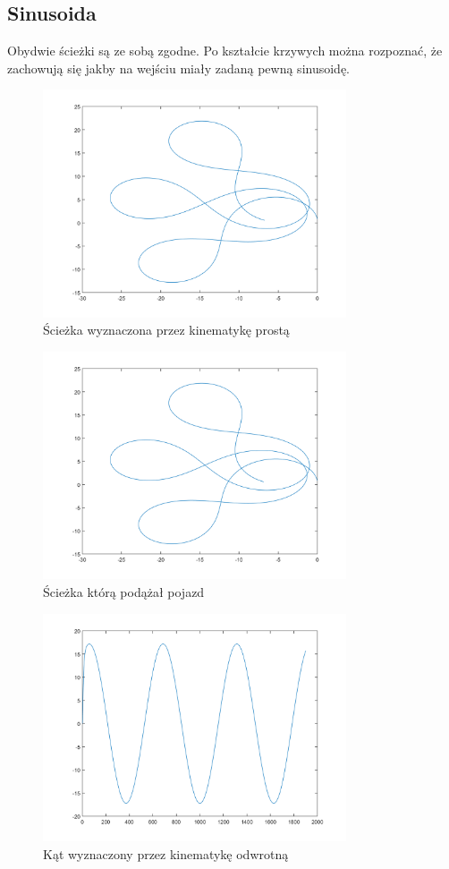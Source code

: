 \documentclass[a4paper, 12pt]{report}
\begin{document}
			\subsection{Sinusoida}
				Obydwie ścieżki są ze sobą zgodne. Po kształcie krzywych można rozpoznać, że zachowują się jakby na wejściu miały zadaną pewną sinusoidę.
				\begin{figure}[H]
					\centering
					\includegraphics[width = 0.8\textwidth]{./AP/img/sin_in_1.png}
					\caption{Ścieżka wyznaczona przez kinematykę prostą}
				\end{figure}
				\begin{figure}[H]
					\centering
					\includegraphics[width = 0.8\textwidth]{./AP/img/sin_in_2.png}
					\caption{Ścieżka którą podążał pojazd}
				\end{figure}
				\begin{figure}[H]
					\centering
					\includegraphics[width = 0.8\textwidth]{./AP/img/sin_in_3.png}
					\caption{Kąt wyznaczony przez kinematykę odwrotną}
				\end{figure}
\end{document}
